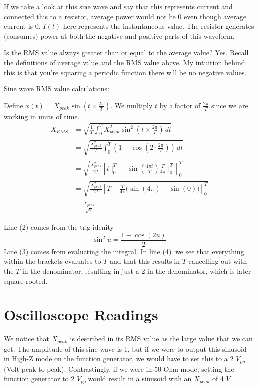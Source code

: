 If we take a look at this sine wave and say that this represents current and connected this to a resistor, average power would not be 0 even though average current is 0. $I(t)$ here represents the instantaneous value. 
The resistor generates (consumes) power at both the negative and positive parts of this waveform.



\begin{sanity}
    Is the RMS value always greater than or equal to the average value? 
    Yes. 
    Recall the definitions of average value and the RMS value above. 
    My intuition behind this is that you're squaring a periodic function there will be no negative values.
\end{sanity}

Sine wave RMS value calculations:

Define $x(t) = X_{peak} \sin{(t \times \frac{2\pi}{T})}$. We multiply $t$ by a factor of $\frac{2\pi}{T}$ since we are working in units of time.
\begin{align*} 
    X_{RMS} &= \sqrt{\frac{1}{T} \int_0^T X_{peak}^2 \sin^2{(t \times \frac{2\pi}{T})} \,dt} \tag{1} \\
    &= \sqrt{\frac{X_{peak}^2}{T} \int_0^T (1-\cos{(2\cdot \frac{2\pi}{T})}) \,dt} \tag{2} \\
    &= \sqrt{\frac{X_{peak}^2}{2T} \left[t \mid_0^T - \sin{(\frac{4\pi t}{T})\frac{T}{4\pi} \mid_0^T}\right]_0^T} \tag{3} \\ 
    &= \sqrt{\frac{X_{peak}^2}{2T} \left[T - \frac{T}{4\pi}(\sin{(4\pi) - \sin{(0))}}\right]_0^T} \tag{4} \\
    &= \frac{X_{peak}}{\sqrt{2}} \tag{5}
\end{align*}

Line (2) comes from the trig idenity 
    \[\sin^2{u} = \frac{1-\cos{(2u)}}{2}\]
Line (3) comes from evaluating the integral. 
In line (4), we see that everything within the brackets evaluates to $T$ and that this results in $T$ cancelling out with the $T$ in the denominator, resulting in just a 2 in the denominator, which is later square rooted.

\section{Oscilloscope Readings}
We notice that $X_{peak}$ is described in its RMS value as the large value that we can get. 
The amplitude of this sine wave is 1, but if we were to output this sinusoid in High-Z mode on the function generator, we would have to set this to a 2 $V_{pp}$ (Volt peak to peak). 
Contrastingly, if we were in 50-Ohm mode, setting the function generator to 2 $V_{pp}$ would result in a sinusoid with an $X_{peak}$ of 4 $V$.

